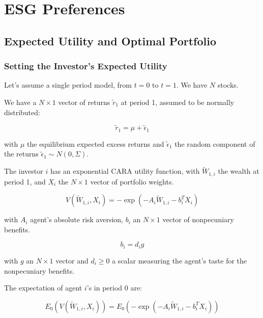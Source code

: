 \chapter{ESG Preferences}



\section{Expected Utility and Optimal Portfolio}


\subsection{Setting the Investor's Expected Utility}

Let's assume a single period model, from $t=0$ to $t=1$.
We have $N$ stocks. 

We have a $N \times 1$ vector of returns $\tilde{r}_1$ at period 1, 
assumed to be normally distributed: 

\begin{equation}
    \tilde{r}_1 = \mu + \tilde{\epsilon}_1
\end{equation}

with $\mu$ the equilibrium expected excess returns and $\tilde{\epsilon}_1$ the
random component of the returns $\tilde{\epsilon}_1 \sim N(0, \Sigma)$.

The investor $i$ has an exponential CARA utility function, with 
$\tilde{W}_{1,i}$ the wealth at period 1, and $X_i$ the
$N \times 1$ vector of portfolio weights.

\begin{equation}
    V(\tilde{W}_{1,i}, X_i) = -\exp{(-A_i \tilde{W}_{1,i}-b_i^T X_i)}
\end{equation}

with $A_i$ agent's absolute risk aversion, $b_i$ an $N \times 1$ vector of nonpecuniary 
benefits. 

\begin{equation}
    b_i = d_i g 
\end{equation}

with $g$ an $N \times 1$ vector and $d_i \geq 0$ a scalar measuring 
the agent's taste for the nonpecuniary benefits.


The expectation of agent $i$'s in period 0 are:

\begin{equation}
    E_0(V(\tilde{W}_{1,i}, X_i)) = E_0(-\exp{(-A_i \tilde{W}_{1,i}-b_i^T X_i)})
\end{equation}

